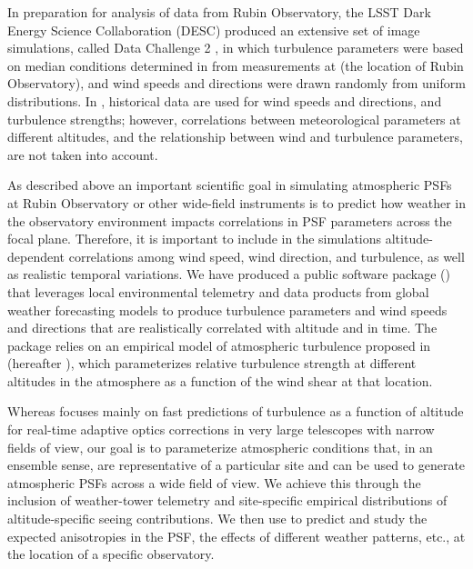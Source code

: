 \documentclass[twocolumn]{aastex631}
\begin{document}
In preparation for analysis of data from Rubin Observatory, the LSST Dark Energy Science Collaboration (DESC) produced an extensive set of image simulations, called Data Challenge 2 \citep[DC2,][hereafter \dcii]{the_lsst_dark_energy_science_collaboration_lsst_2021}, in which turbulence parameters were based on median conditions determined in \cite{ellerbroek_efficient_2002} from measurements at \cp (the location of Rubin Observatory), and wind speeds and directions were drawn randomly from uniform distributions. 
In \cite{peterson_simulation_2015}, historical data are used for wind speeds and directions, and turbulence strengths; however, correlations between meteorological parameters at different altitudes, and the relationship between wind and turbulence parameters, are not taken into account.


As described above an important scientific goal in simulating atmospheric PSFs at Rubin Observatory or other wide-field instruments is to predict how weather in the observatory environment impacts correlations in PSF parameters across the focal plane. 
Therefore, it is important to include in the simulations altitude-dependent correlations among wind speed, wind direction, and turbulence, as well as realistic temporal variations.
We have produced a public software package (\psfws) that leverages local environmental telemetry and data products from global weather forecasting models to produce turbulence parameters and wind speeds and directions that are realistically correlated with altitude and in time. 
The package relies on an empirical model of atmospheric turbulence proposed in \cite{osborn_optical_2018} (hereafter \osborn), which parameterizes relative turbulence strength at different altitudes in the atmosphere as a function of the wind shear at that location. 

Whereas \osborn focuses mainly on fast predictions of turbulence as a function of altitude for real-time adaptive optics corrections in very large telescopes with narrow fields of view, our goal is to parameterize atmospheric conditions that, in an ensemble sense, are representative of a particular site and can be used to generate atmospheric PSFs across a wide field of view. 
We achieve this through the inclusion of weather-tower telemetry and site-specific empirical distributions of altitude-specific seeing contributions. 
We then use \psfws to predict and study the expected anisotropies in the PSF, the effects of different weather patterns, etc., at the location of a specific observatory.
\end{document}
